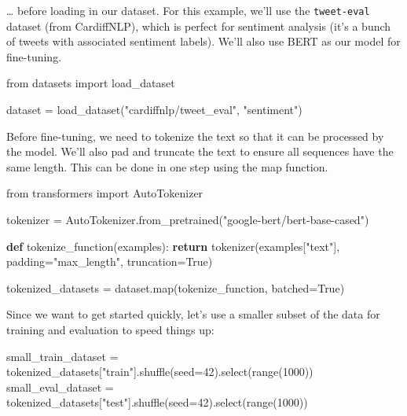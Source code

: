 \documentclass[
  letterpaper,
  DIV=11,
  numbers=noendperiod]{scrreprt}
\newenvironment{Shaded}{\begin{snugshade}}{\end{snugshade}}
\newcommand{\BuiltInTok}[1]{\textcolor[rgb]{0.00,0.23,0.31}{#1}}
\newcommand{\ControlFlowTok}[1]{\textcolor[rgb]{0.00,0.23,0.31}{\textbf{#1}}}
\newcommand{\DecValTok}[1]{\textcolor[rgb]{0.68,0.00,0.00}{#1}}
\newcommand{\ImportTok}[1]{\textcolor[rgb]{0.00,0.46,0.62}{#1}}
\newcommand{\KeywordTok}[1]{\textcolor[rgb]{0.00,0.23,0.31}{\textbf{#1}}}
\newcommand{\NormalTok}[1]{\textcolor[rgb]{0.00,0.23,0.31}{#1}}
\newcommand{\OperatorTok}[1]{\textcolor[rgb]{0.37,0.37,0.37}{#1}}
\newcommand{\StringTok}[1]{\textcolor[rgb]{0.13,0.47,0.30}{#1}}
\newcommand{\VariableTok}[1]{\textcolor[rgb]{0.07,0.07,0.07}{#1}}
\begin{document}
\ldots{} before loading in our dataset. For this example, we'll use the
\texttt{tweet-eval} dataset (from CardiffNLP), which is perfect for
sentiment analysis (it's a bunch of tweets with associated sentiment
labels). We'll also use BERT as our model for fine-tuning.

\begin{Shaded}
\begin{Highlighting}[]
\ImportTok{from}\NormalTok{ datasets }\ImportTok{import}\NormalTok{ load\_dataset}

\NormalTok{dataset }\OperatorTok{=}\NormalTok{ load\_dataset(}\StringTok{"cardiffnlp/tweet\_eval"}\NormalTok{, }\StringTok{"sentiment"}\NormalTok{)}
\end{Highlighting}
\end{Shaded}

Before fine-tuning, we need to tokenize the text so that it can be
processed by the model. We'll also pad and truncate the text to ensure
all sequences have the same length. This can be done in one step using
the map function.

\begin{Shaded}
\begin{Highlighting}[]
\ImportTok{from}\NormalTok{ transformers }\ImportTok{import}\NormalTok{ AutoTokenizer}

\NormalTok{tokenizer }\OperatorTok{=}\NormalTok{ AutoTokenizer.from\_pretrained(}\StringTok{"google{-}bert/bert{-}base{-}cased"}\NormalTok{)}


\KeywordTok{def}\NormalTok{ tokenize\_function(examples):}
    \ControlFlowTok{return}\NormalTok{ tokenizer(examples[}\StringTok{"text"}\NormalTok{], padding}\OperatorTok{=}\StringTok{"max\_length"}\NormalTok{, truncation}\OperatorTok{=}\VariableTok{True}\NormalTok{)}


\NormalTok{tokenized\_datasets }\OperatorTok{=}\NormalTok{ dataset.}\BuiltInTok{map}\NormalTok{(tokenize\_function, batched}\OperatorTok{=}\VariableTok{True}\NormalTok{)}
\end{Highlighting}
\end{Shaded}

Since we want to get started quickly, let's use a smaller subset of the
data for training and evaluation to speed things up:

\begin{Shaded}
\begin{Highlighting}[]
\NormalTok{small\_train\_dataset }\OperatorTok{=}\NormalTok{ tokenized\_datasets[}\StringTok{"train"}\NormalTok{].shuffle(seed}\OperatorTok{=}\DecValTok{42}\NormalTok{).select(}\BuiltInTok{range}\NormalTok{(}\DecValTok{1000}\NormalTok{))}
\NormalTok{small\_eval\_dataset }\OperatorTok{=}\NormalTok{ tokenized\_datasets[}\StringTok{"test"}\NormalTok{].shuffle(seed}\OperatorTok{=}\DecValTok{42}\NormalTok{).select(}\BuiltInTok{range}\NormalTok{(}\DecValTok{1000}\NormalTok{))}
\end{Highlighting}
\end{Shaded}
\end{document}
